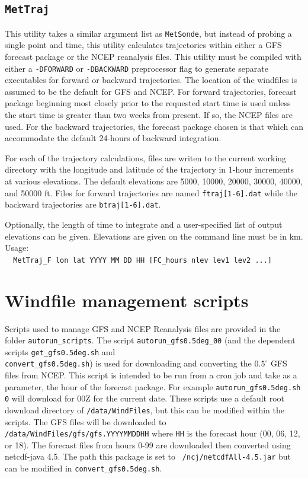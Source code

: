 \documentclass[11pt]{article}   %
\begin{document}
\subsection{\texttt{MetTraj}}
This utility takes a similar argument list as \texttt{MetSonde}, but instead of
probing a single point and time, this utility calculates trajectories within
either a GFS forecast package or the NCEP reanalysis files.
This utility must be compiled with either a \texttt{-DFORWARD} or \texttt{-DBACKWARD}
preprocessor flag to generate separate executables for forward or backward trajectories.
The location of the windfiles is assumed to be the default for GFS and NCEP.  For 
forward trajectories, forecast package beginning most closely prior to the requested
start time is used unless the start time is greater than two weeks from present.  If
so, the NCEP files are used.  For the backward trajectories, the forecast package
chosen is that which can accommodate the default 24-hours of backward integration.

For each of the trajectory calculations, files are writen to the current working directory
with the longitude and latitude of the trajectory in 1-hour increments at various
elevations.  The default elevations are 5000, 10000, 20000, 30000, 40000, and
50000 $\mathrm{ft}$.  Files for forward trajectories are named \texttt{ftraj[1-6].dat}
while the backward trajectories are  \texttt{btraj[1-6].dat}.

Optionally, the length of time to integrate and a user-specified list of output
elevations can be given.  Elevations are given on the command line must be in
$\mathrm{km}$.
Usage:\\
\verb|  MetTraj_F lon lat YYYY MM DD HH [FC_hours nlev lev1 lev2 ...]|


\section{Windfile management scripts}
Scripts used to manage GFS and NCEP Reanalysis files are provided in the
folder \texttt{autorun\_scripts}.
The script \texttt{autorun\_gfs0.5deg\_00} (and the dependent scripts
\texttt{get\_gfs0.5deg.sh} and\\
\texttt{convert\_gfs0.5deg.sh}) is used for downloading and
converting the $0.5^{\circ}$ GFS files from NCEP.  This script is intended to be
run from a cron job and take as a parameter, the hour of the forecast package.  For example
\texttt{autorun\_gfs0.5deg.sh 0} will download for 00Z for the current date.  These 
scripts use a default root download directory of \texttt{/data/WindFiles}, but this can
be modified within the scripts.  The GFS files will be downloaded to\\
\texttt{/data/WindFiles/gfs/gfs.YYYYMMDDHH} where \texttt{HH} is the forecast hour
(00, 06, 12, or 18).  The forecast files from hours 0-99 are downloaded then converted using
netcdf-java 4.5.  The path this package is set to \texttt{~/ncj/netcdfAll-4.5.jar} but can be
modified in \texttt{convert\_gfs0.5deg.sh}.
\end{document}
